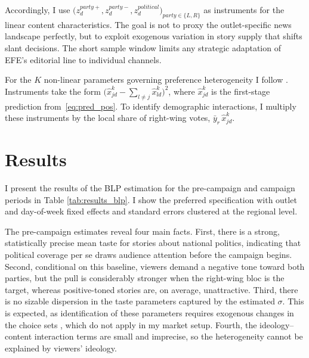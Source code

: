 \documentclass[12pt]{article}
\begin{document}
	
	
	
	Accordingly, I use
	$\bigl(z_d^{party+},z_d^{party-},z_d^{political}\bigr)_{party\in\{L,R\}}$
	as instruments for the linear content characteristics.  The goal is not to proxy the outlet-specific news landscape perfectly, but to exploit exogenous variation in story supply that shifts slant decisions.  
	The short sample window limits any strategic adaptation of EFE’s editorial line to individual channels.
	
	For the $K$ non-linear parameters governing preference heterogeneity I follow \citet{gandhi2019measuring}.  
	Instruments take the form
	$\bigl(\hat{x}_{jd}^k-\sum_{l\neq j}\hat{x}_{ld}^k\bigr)^2$,
	where $\hat{x}_{jd}^k$ is the first-stage prediction from~\eqref{eq:pred_pos}.
	To identify demographic interactions, I multiply these instruments by the local share of right-wing votes, $\bar y_r\,\hat{x}_{jd}^k$.







	\section{Results}
	
	\label{section:results}
	
	I present the results of the BLP estimation for the pre-campaign and campaign periods in Table \ref{tab:results_blp}. I show the preferred specification with outlet and day-of-week fixed effects and standard errors clustered at the regional level.
	
	The pre-campaign estimates reveal four main facts. First, there is a strong, statistically precise mean taste for stories about national politics, indicating that political coverage per se draws audience attention before the campaign begins. Second, conditional on this baseline, viewers demand a negative tone toward both parties, but the pull is considerably stronger when the right-wing bloc is the target, whereas positive-toned stories are, on average, unattractive. Third, there is no sizable dispersion in the taste parameters captured by the estimated $\sigma$. This is expected, as identification of these parameters requires exogenous changes in the choice sets \citep{berry_haile_econometrica}, which do not apply in my market setup. Fourth, the ideology–content interaction terms are small and imprecise, so the heterogeneity cannot be explained by viewers’ ideology.
	
\end{document}

